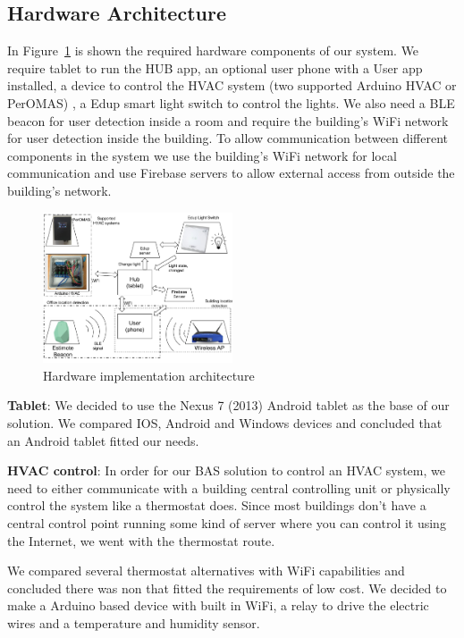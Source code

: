 \documentclass[conference]{IEEEtran}
\begin{document}
\subsection{Hardware Architecture}\label{hardware_arch_imp}

In Figure~\ref{imp:architecture_system} is shown the required hardware components of our system. We require tablet to run the HUB app, an optional user phone with a User app installed, a device to control the HVAC system (two supported Arduino HVAC or PerOMAS) , a Edup smart light switch to control the lights. We also need a \ac{BLE} beacon for user detection inside a room and require the building's \ac{WiFi} network for user detection inside the building.
To allow communication between different components in the system we use the building's \ac{WiFi} network for local communication and use Firebase servers to allow external access from outside the building's network.


\begin{figure}[h]
\centering
\includegraphics[width=0.5\textwidth]{Figures/harware_arch_imp}
\caption{Hardware implementation architecture}
\label{imp:architecture_system}
\end{figure}

\textbf{Tablet}: We decided to use the Nexus 7 (2013) Android tablet as the base of our solution. We compared IOS, Android and Windows devices and concluded that an Android tablet fitted our needs.

\textbf{HVAC control}: In order for our \ac{BAS} solution to control an \ac{HVAC} system, we need to either communicate with a building central controlling unit or physically control the system like a thermostat does. Since most buildings don't have a central control point running some kind of server where you can control it using the Internet, we went with the thermostat route.

We compared several thermostat alternatives with WiFi capabilities and concluded there was non that fitted the requirements of low cost. We decided to make a Arduino based device with built in \ac{WiFi}, a relay to drive the electric wires and a temperature and humidity sensor. 
\end{document}
